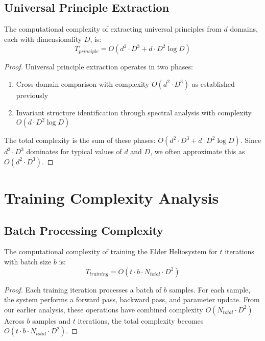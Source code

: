 \subsection{Universal Principle Extraction}

\begin{theorem}
The computational complexity of extracting universal principles from $d$ domains, each with dimensionality $D$, is:
\begin{equation}
T_{principle} = O(d^2 \cdot D^3 + d \cdot D^2 \log D)
\end{equation}
\end{theorem}

\begin{proof}
Universal principle extraction operates in two phases:
\begin{enumerate}
    \item Cross-domain comparison with complexity $O(d^2 \cdot D^3)$ as established previously
    \item Invariant structure identification through spectral analysis with complexity $O(d \cdot D^2 \log D)$
\end{enumerate}
The total complexity is the sum of these phases: $O(d^2 \cdot D^3 + d \cdot D^2 \log D)$. Since $d^2 \cdot D^3$ dominates for typical values of $d$ and $D$, we often approximate this as $O(d^2 \cdot D^3)$.
\end{proof}

\section{Training Complexity Analysis}

\subsection{Batch Processing Complexity}

\begin{theorem}
The computational complexity of training the Elder Heliosystem for $t$ iterations with batch size $b$ is:
\begin{equation}
T_{training} = O(t \cdot b \cdot N_{total} \cdot D^2)
\end{equation}
\end{theorem}

\begin{proof}
Each training iteration processes a batch of $b$ samples. For each sample, the system performs a forward pass, backward pass, and parameter update. From our earlier analysis, these operations have combined complexity $O(N_{total} \cdot D^2)$. Across $b$ samples and $t$ iterations, the total complexity becomes $O(t \cdot b \cdot N_{total} \cdot D^2)$.
\end{proof}

